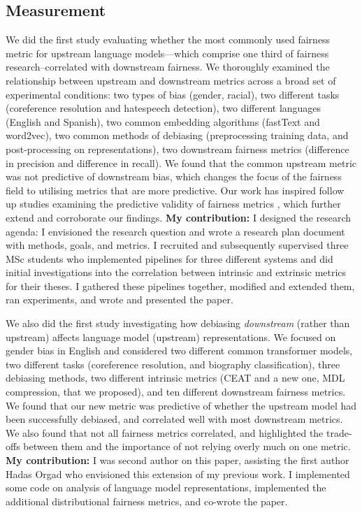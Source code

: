 \subsection{Measurement} 
We did the first study evaluating whether the most commonly used fairness metric for upstream language models---which comprise one third of fairness research--correlated with downstream fairness. We thoroughly examined the relationship between upstream and downstream metrics across a broad set of experimental conditions: two types of bias (gender, racial), two different tasks (coreference resolution and hatespeech detection), two different languages (English and Spanish), two common embedding algorithms (fastText and word2vec), two common methods of debiasing (preprocessing training data, and post-processing on representations), two downstream fairness metrics (difference in precision and difference in recall). We found that the common upstream metric was not predictive of downstream bias, which changes the focus of the fairness field to utilising metrics that are more predictive. Our work has inspired follow up studies examining the predictive validity of fairness metrics \citep{cao-etal-2022-intrinsic, others?}, which further extend and corroborate our findings. \textbf{My contribution:} I designed the research agenda: I envisioned the research question and wrote a research plan document with methods, goals, and metrics. I recruited and subsequently supervised three MSc students who implemented pipelines for three different systems and did initial investigations into the correlation between intrinsic and extrinsic metrics for their theses. I gathered these pipelines together, modified and extended them, ran experiments, and wrote and presented the paper. 

We also did the first study investigating how debiasing \textit{downstream} (rather than upstream) affects language model (upstream) representations. We focused on gender bias in English and considered two different common transformer models, two different tasks (coreference resolution, and biography classification), three debiasing methods, two different intrinsic metrics (CEAT and a new one, MDL compression, that we proposed), and ten different downstream fairness metrics. We found that our new metric was predictive of whether the upstream model had been successfully debiased, and correlated well with most downstream metrics. We also found that not all fairness metrics correlated, and highlighted the trade-offs between them and the importance of not relying overly much on one metric. \textbf{My contribution:} I was second author on this paper, assisting the first author Hadas Orgad who envisioned this extension of my previous work. I implemented some code on analysis of language model representations, implemented the additional distributional fairness metrics, and co-wrote the paper.

